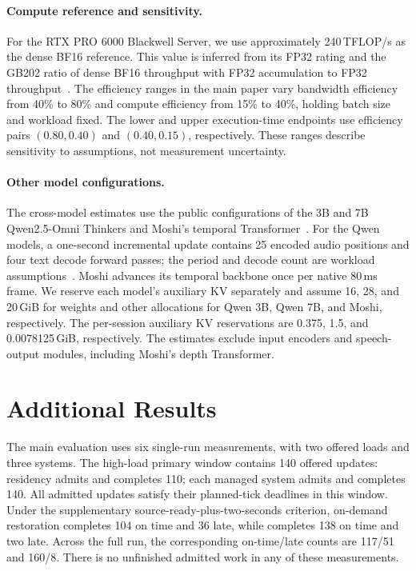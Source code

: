 \documentclass[sigplan,10pt,anonymous,review]{acmart}
\begin{document}
\paragraph{Compute reference and sensitivity.}
For the RTX PRO 6000 Blackwell Server, we use approximately 240\,TFLOP/s as the dense BF16 reference.
This value is inferred from its FP32 rating and the GB202 ratio of dense BF16 throughput with FP32 accumulation to FP32 throughput~\cite{nvidia2026rtxpro,nvidia2025blackwell}.
The efficiency ranges in the main paper vary bandwidth efficiency from 40\% to 80\% and compute efficiency from 15\% to 40\%, holding batch size and workload fixed.
The lower and upper execution-time endpoints use efficiency pairs $(0.80,0.40)$ and $(0.40,0.15)$, respectively.
These ranges describe sensitivity to assumptions, not measurement uncertainty.

\paragraph{Other model configurations.}
The cross-model estimates use the public configurations of the 3B and 7B Qwen2.5-Omni Thinkers and Moshi's temporal Transformer~\cite{qwen2025omni3bconfig,qwen2025omni7bconfig,defossez2024moshi,kyutai2026moshiconfig}.
For the Qwen models, a one-second incremental update contains 25 encoded audio positions and four text decode forward passes; the period and decode count are workload assumptions~\cite{xu2025qwenomni}.
Moshi advances its temporal backbone once per native 80\,ms frame.
We reserve each model's auxiliary KV separately and assume 16, 28, and 20\,GiB for weights and other allocations for Qwen 3B, Qwen 7B, and Moshi, respectively.
The per-session auxiliary KV reservations are 0.375, 1.5, and 0.0078125\,GiB, respectively.
The estimates exclude input encoders and speech-output modules, including Moshi's depth Transformer.

\section{Additional Results}
The main evaluation uses six single-run measurements, with two offered loads and three systems.
The high-load primary window contains 140 offered updates: residency admits and completes 110; each managed system admits and completes 140.
All admitted updates satisfy their planned-tick deadlines in this window.
Under the supplementary source-ready-plus-two-seconds criterion, on-demand restoration completes 104 on time and 36 late, while \systemname completes 138 on time and two late.
Across the full run, the corresponding on-time/late counts are 117/51 and 160/8.
There is no unfinished admitted work in any of these measurements.
\end{document}
